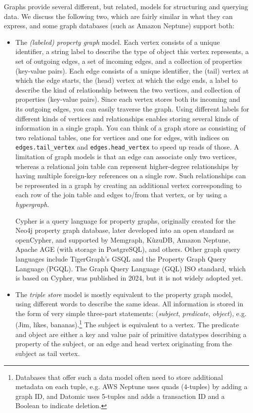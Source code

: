 \documentclass[table, xcdraw]{article}%
\begin{document}
Graphs provide several different, but related, models for structuring and querying data. We discuss the following two, which are fairly similar in what they can express, and some graph databases (such as Amazon Neptune) support both:

\begin{itemize}
    \item The \textit{(labeled) property graph} model. Each vertex consists of a unique identifier, a string label to describe the type of object this vertex represents, a set of outgoing edges, a set of incoming edges, and a collection of properties (key-value pairs). Each edge consists of a unique identifier, the (tail) vertex at which the edge starts, the (head) vertex at which the edge ends, a label to describe the kind of relationship between the two vertices, and collection of properties (key-value pairs). Since each vertex stores both its incoming and its outgoing edges, you can easily traverse the graph. Using different labels for different kinds of vertices and relationships enables storing several kinds of information in a single graph. You can think of a graph store as consisting of two relational tables, one for vertices and one for edges, with indices on \texttt{edges.tail_vertex} and \texttt{edges.head_vertex} to speed up reads of those. A limitation of graph models is that an edge can associate only two vertices, whereas a relational join table can represent higher-degree relationships by having multiple foreign-key references on a single row. Such relationships can be represented in a graph by creating an additional vertex corresponding to each row of the join table and edges to/from that vertex, or by using a \textit{hypergraph}.

    Cypher is a query language for property graphs, originally created for the Neo4j property graph database, later developed into an open standard as openCypher, and supported by Memgraph, KùzuDB, Amazon Neptune, Apache AGE (with storage in PostgreSQL), and others. Other graph query languages include TigerGraph’s GSQL and the Property Graph Query Language (PGQL). The Graph Query Language (GQL) ISO standard, which is based on Cypher, was published in 2024, but it is not widely adopted yet.
    \item The \textit{triple store} model is mostly equivalent to the property graph model, using different words to describe the same ideas. All information is stored in the form of very simple three-part statements: (\textit{subject}, \textit{predicate}, \textit{object}), e.g. (Jim, likes, bananas).\footnote{Databases that offer such a data model often need to store additional metadata on each tuple, e.g. AWS Neptune uses quads (4-tuples) by adding a graph ID, and Datomic uses 5-tuples and adds a transaction ID and a Boolean to indicate deletion.} The subject is equivalent to a vertex. The predicate and object are either a key and value pair of primitive datatypes describing a property of the subject, or an edge and head vertex originating from the subject as tail vertex.


\end{itemize}
\end{document}
